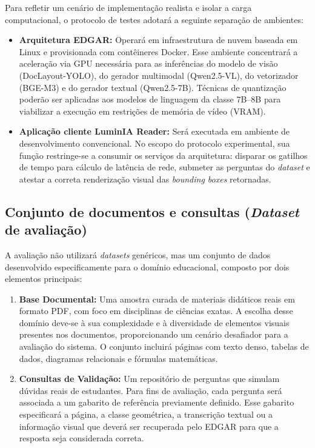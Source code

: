 Para refletir um cenário de implementação realista e isolar a carga computacional, o protocolo de testes adotará a seguinte separação de ambientes:
\begin{itemize}
    \item \textbf{Arquitetura EDGAR:} Operará em infraestrutura de nuvem baseada em Linux e provisionada com contêineres Docker. Esse ambiente concentrará a aceleração via GPU necessária para as inferências do modelo de visão (DocLayout-YOLO), do gerador multimodal (Qwen2.5-VL), do vetorizador (BGE-M3) e do gerador textual (Qwen2.5-7B). Técnicas de quantização poderão ser aplicadas aos modelos de linguagem da classe 7B--8B para viabilizar a execução em restrições de memória de vídeo (VRAM).
    \item \textbf{Aplicação cliente LuminIA Reader:} Será executada em ambiente de desenvolvimento convencional. No escopo do protocolo experimental, sua função restringe-se a consumir os serviços da arquitetura: disparar os gatilhos de tempo para cálculo de latência de rede, submeter as perguntas do \textit{dataset} e atestar a correta renderização visual das \textit{bounding boxes} retornadas.
\end{itemize}

\subsection{Conjunto de documentos e consultas (\textit{Dataset} de avaliação)}
\label{subsec:conjunto_documentos_perguntas}

A avaliação não utilizará \textit{datasets} genéricos, mas um conjunto de dados desenvolvido especificamente para o domínio educacional, composto por dois elementos principais:

\begin{enumerate}
\item \textbf{Base Documental:} Uma amostra curada de materiais didáticos reais em formato PDF, com foco em disciplinas de ciências exatas. A escolha desse domínio deve-se à sua complexidade e à diversidade de elementos visuais presentes nos documentos, proporcionando um cenário desafiador para a avaliação do sistema. O conjunto incluirá páginas com texto denso, tabelas de dados, diagramas relacionais e fórmulas matemáticas.

\item \textbf{Consultas de Validação:} Um repositório de perguntas que simulam dúvidas reais de estudantes. Para fins de avaliação, cada pergunta será associada a um gabarito de referência previamente definido. Esse gabarito especificará a página, a classe geométrica, a transcrição textual ou a informação visual que deverá ser recuperada pelo EDGAR para que a resposta seja considerada correta.

\end{enumerate}


